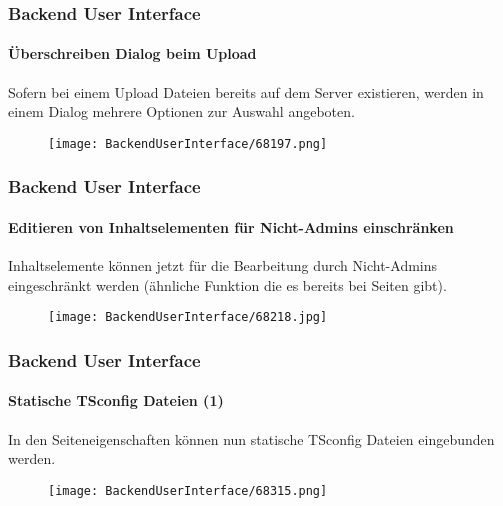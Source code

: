 \begin{frame}[fragile]
	\frametitle{Backend User Interface}
	\framesubtitle{Überschreiben Dialog beim Upload}

	Sofern bei einem Upload Dateien bereits auf dem Server existieren,
	werden in einem Dialog mehrere Optionen zur Auswahl angeboten.

	\begin{figure}
		\texttt{[image: BackendUserInterface/68197.png]}
	\end{figure}

\end{frame}


\begin{frame}[fragile]
	\frametitle{Backend User Interface}
	\framesubtitle{Editieren von Inhaltselementen für Nicht-Admins einschränken}

	Inhaltselemente können jetzt für die Bearbeitung durch Nicht-Admins eingeschränkt werden
	(ähnliche Funktion die es bereits bei Seiten gibt).

	\begin{figure}
		\texttt{[image: BackendUserInterface/68218.jpg]}
	\end{figure}

\end{frame}

\begin{frame}[fragile]
	\frametitle{Backend User Interface}
	\framesubtitle{Statische TSconfig Dateien (1)}

	In den Seiteneigenschaften können nun statische TSconfig Dateien eingebunden werden.

	\begin{figure}
		\texttt{[image: BackendUserInterface/68315.png]}
	\end{figure}

\end{frame}

